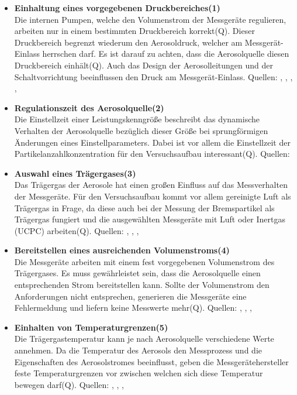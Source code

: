 \begin{itemize}
\item \textbf{Einhaltung eines vorgegebenen Druckbereiches(1)}\\
Die internen Pumpen, welche den Volumenstrom der Messger\"{a}te regulieren, arbeiten nur in einem bestimmten Druckbereich korrekt(Q). Dieser Druckbereich begrenzt wiederum den Aerosoldruck, welcher am Messger\"{a}t-Einlass herrschen darf. Es ist darauf zu achten, dass die Aerosolquelle diesen Druckbereich einh\"{a}lt(Q). 
Auch das Design der Aerosolleitungen und der Schaltvorrichtung beeinflussen den Druck am Messger\"{a}t-Einlass. 
Quellen: \cite{fmps_3091}, \cite{ops_3330}, \cite{aps_3321}, \cite{ucpc_3776}, \cite{tsl_skript}

\item \textbf{Regulationszeit des Aerosolquelle(2)}\\
Die Einstellzeit einer Leistungskenngr\"{o}{\ss}e beschreibt das dynamische Verhalten der Aerosolquelle bez\"{u}glich dieser Gr\"{o}{\ss}e bei sprungf\"{o}rmigen \"{A}nderungen eines Einstellparameters. Dabei ist vor allem die Einstellzeit der Partikelanzahlkonzentration f\"{u}r den Versuchsaufbau interessant(Q). 
Quellen: \cite{vdi3491}

\item \textbf{Auswahl eines Tr\"{a}gergases(3)}\\
Das Tr\"{a}gergas der Aerosole hat einen gro{\ss}en Einfluss auf das Messverhalten der Messger\"{a}te.  F\"{u}r den Versuchsaufbau kommt vor allem gereinigte Luft als Tr\"{a}gergas in Frage, da diese auch bei der Messung der Bremspartikel als Tr\"{a}gergas fungiert und die ausgew\"{a}hlten Messger\"{a}te mit Luft oder Inertgas (UCPC) arbeiten(Q). 
Quellen: \cite{fmps_3091}, \cite{ops_3330}, \cite{aps_3321}, \cite{ucpc_3776}

\item \textbf{Bereitstellen eines ausreichenden Volumenstroms(4)}\\
Die Messger\"{a}te arbeiten mit einem fest vorgegebenen Volumenstrom des Tr\"{a}gergases.  Es muss gew\"{a}hrleistet sein, dass die Aerosolquelle einen entsprechenden Strom bereitstellen kann. Sollte der Volumenstrom den Anforderungen nicht entsprechen, generieren die Messger\"{a}te eine Fehlermeldung und liefern keine Messwerte mehr(Q). 
Quellen: \cite{fmps_3091}, \cite{ops_3330}, \cite{aps_3321}, \cite{ucpc_3776}

\item \textbf{Einhalten von Temperaturgrenzen(5)}\\ 
Die Tr\"{a}gergastemperatur kann je nach Aerosolquelle verschiedene Werte annehmen. Da die Temperatur des Aerosols den Messprozess und die Eigenschaften des Aerosolstromes beeinflusst, geben die Messger\"{a}tehersteller feste Temperaturgrenzen vor zwischen welchen sich diese Temperatur bewegen darf(Q). 
Quellen: \cite{fmps_3091}, \cite{ops_3330}, \cite{aps_3321}, \cite{ucpc_3776}
\end{itemize}

